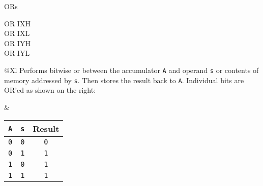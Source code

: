 \begin{basedescript}{
	\desclabelstyle{\multilinelabel}
	\desclabelwidth{3cm}}
\begin{DetailItem}{OR}{s}
\begin{DetailVariants}[4]
			\columnbreak
			OR IXH\UNDOC\\
			OR IXL\UNDOC\\
			OR IYH\UNDOC\\
			OR IYL\UNDOC
		\end{DetailVariants}

		\begin{tabularx}{\linewidth}{@{}Xl}
			Performs bitwise or between the accumulator {\tt A} and operand {\tt s} or contents of memory addressed by {\tt s}. Then stores the result back to {\tt A}. Individual bits are OR'ed as shown on the right:
	
			&

			\begin{tabular}[t]{cc|c}
				{\tt A} & {\tt s} & Result \\
				\hline
				{\tt 0} & {\tt 0} & {\tt 0} \\
				{\tt 0} & {\tt 1} & {\tt 1} \\
				{\tt 1} & {\tt 0} & {\tt 1} \\
				{\tt 1} & {\tt 1} & {\tt 1} \\
			\end{tabular}

			\\
		\end{tabularx}

		\begin{DetailEffects}[p]
			\FlagsORr
		\end{DetailEffects}

		\begin{DetailEffectsFlags}
			\DetailFlagSF{\DetailFlagResultSign}
			\DetailFlagZF{\DetailFlagResultZero}
			\DetailFlagPV{\DetailFlagResultParity}
		\end{DetailEffectsFlags}
				
		\begin{DetailTiming}
		\end{DetailTiming}

	\end{DetailItem}

	\pagebreak



\end{basedescript}
